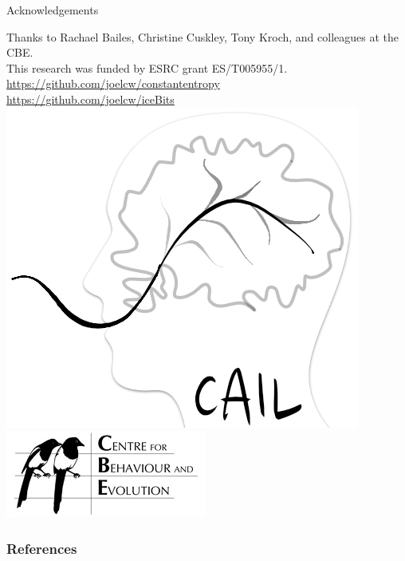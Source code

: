 \documentclass[hyperref={pdfpagelabels=false}]{beamer}
\begin{document}
\begin{frame}{Acknowledgements}
	\begin{center}
		
		Thanks to Rachael Bailes, Christine Cuskley, Tony Kroch, and colleagues at the CBE.\\This research was funded by ESRC grant ES/T005955/1.
		\url{https://github.com/joelcw/constantentropy}\\
		\url{https://github.com/joelcw/iceBits}\\\vspace{3mm}
		\includegraphics[scale = 0.2]{caillogo.png}
		\includegraphics[scale = 0.4]{CBElogo.jpg}
	\end{center}
\end{frame}





\begin{frame}[allowframebreaks]
\frametitle{References}


\end{frame}
\end{document}
